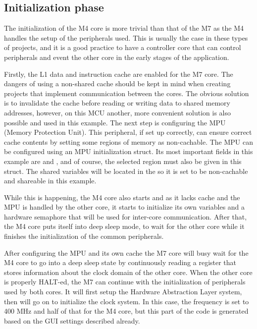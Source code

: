 \subsection{Initialization phase}

The initialization of the M4 core is more trivial than that of the M7 as the M4 handles the setup of the peripherals used. This is usually the case in these types of projects, and it is a good practice to have a controller core that can control peripherals and event the other core in the early stages of the application.

Firstly, the L1 data and instruction cache are enabled for the M7 core. The dangers of using a non-shared cache should be kept in mind when creating projects that implement communication between the cores. The obvious solution is to invalidate the cache before reading or writing data to shared memory addresses, however, on this MCU another, more convenient solution is also possible and used in this example. The next step is configuring the MPU (Memory Protection Unit). This peripheral, if set up correctly, can ensure correct cache contents by setting some regions of memory as non-cachable. The MPU can be configured using an MPU initialization struct. Its most important fields in this example are  and , and of course, the selected region must also be given in this struct. The shared variables will be located in the  so it is set to be non-cachable and shareable in this example.

While this is happening, the M4 core also starts and as it lacks cache and the MPU is handled by the other core, it starts to initialize its own variables and a hardware semaphore that will be used for inter-core communication. After that, the M4 core puts itself into deep sleep mode, to wait for the other core while it finishes the initialization of the common peripherals.

After configuring the MPU and its own cache the M7 core will busy wait for the M4 core to go into a deep sleep state by continuously reading a register that stores information about the clock domain of the other core. When the other core is properly HALT-ed, the M7 can continue with the initialization of peripherals used by both cores. It will first setup the Hardware Abstraction Layer system, then will go on to initialize the clock system. In this case, the frequency is set to 400 MHz and half of that for the M4 core, but this part of the code is generated based on the GUI settings described already.

